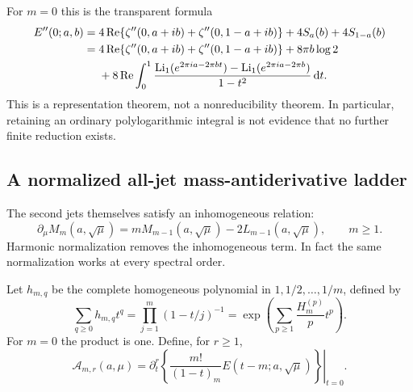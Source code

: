 \documentclass[11pt]{article}
\numberwithin{equation}{section}
\theoremstyle{definition}\newtheorem{definition}[theorem]{Definition}
\theoremstyle{remark}\newtheorem{remark}[theorem]{Remark}
\DeclareMathOperator{\Li}{Li}
\DeclareMathOperator{\Rea}{Re}
\newcommand{\dd}{\,\mathrm d}
\begin{document}
For $m=0$ this is the transparent formula
\begin{align}
 E''(0;a,b)={}&4\Rea\{\zeta''(0,a+ib)+\zeta''(0,1-a+ib)\}
                         +4S_a(b)+4S_{1-a}(b)\notag\\
 ={}&4\Rea\{\zeta''(0,a+ib)+\zeta''(0,1-a+ib)\}
 +8\pi b\log2\notag\\
 &+8\Rea\int_0^1\frac{\Li_1(e^{2\pi ia-2\pi bt})
                      -\Li_1(e^{2\pi ia-2\pi b})}{1-t^2}\dd t.
 \label{hsd:eq:M0explicit}
\end{align}
This is a representation theorem, not a nonreducibility theorem. In
particular, retaining an ordinary polylogarithmic integral is not evidence
that no further finite reduction exists.

\subsection{A normalized all-jet mass-antiderivative ladder}
The second jets themselves satisfy an inhomogeneous relation:
\begin{equation}\label{hsd:eq:M-inhomogeneous}
 \partial_{\mu}M_m(a,\sqrt\mu)
       =mM_{m-1}(a,\sqrt\mu)-2L_{m-1}(a,\sqrt\mu),\qquad m\ge1.
\end{equation}
Harmonic normalization removes the inhomogeneous term. In fact the same
normalization works at every spectral order.

Let $h_{m,q}$ be the complete homogeneous polynomial in
$1,1/2,\ldots,1/m$, defined by
\begin{equation}\label{hsd:eq:completeH}
 \sum_{q\ge0}h_{m,q}t^q=\prod_{j=1}^m(1-t/j)^{-1}
 =\exp\left(\sum_{p\ge1}\frac{H_m^{(p)}}p t^p\right).
\end{equation}
For $m=0$ the product is one. Define, for $r\ge1$,
\begin{equation}\label{hsd:eq:normalizedjet}
 \mathcal A_{m,r}(a,\mu)=
 \left.\partial_t^r\left\{\frac{m!}{(1-t)_m}
                        E(t-m;a,\sqrt\mu)\right\}\right|_{t=0}.
\end{equation}
\end{document}
